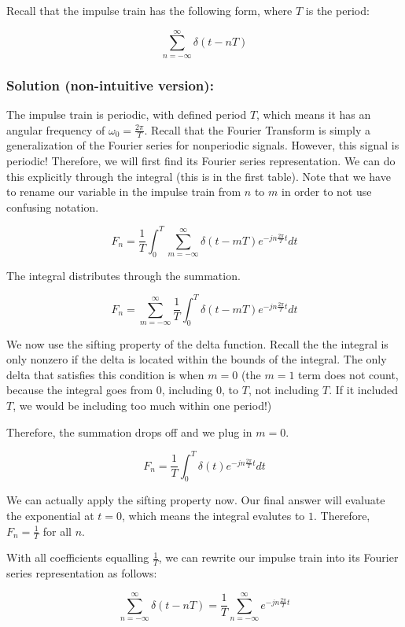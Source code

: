 \documentclass{article}
\begin{document}
Recall that the impulse train has the following form, where $T$ is the period:

$$\sum_{n = -\infty}^{\infty} \delta(t - nT)$$

\subsubsection{Solution (non-intuitive version):}

The impulse train is periodic, with defined period $T$, which means it has an angular frequency of $\omega_0 = \frac{2\pi}{T}$. Recall that the Fourier Transform is simply a generalization of the Fourier series for nonperiodic signals. However, this signal is periodic! Therefore, we will first find its Fourier series representation. We can do this explicitly through the integral (this is in the first table). Note that we have to rename our variable in the impulse train from $n$ to $m$ in order to not use confusing notation.

\[
F_n = \frac{1}{T}\int_{0}^{T} \sum_{m = -\infty}^{\infty} \delta(t - mT) e^{-jn\frac{2\pi}{T}t}dt
\]

The integral distributes through the summation.

\[
F_n = \sum_{m = -\infty}^{\infty} \frac{1}{T}\int_{0}^{T} \delta(t - mT) e^{-jn\frac{2\pi}{T}t}dt
\]

We now use the sifting property of the delta function. Recall the the integral is only nonzero if the delta is located within the bounds of the integral. The only delta that satisfies this condition is when $m = 0$ (the $m = 1$ term does not count, because the integral goes from $0$, including $0$, to $T$, not including $T$. If it included $T$, we would be including too much within one period!)

Therefore, the summation drops off and we plug in $m = 0$.

\[
F_n = \frac{1}{T}\int_{0}^{T} \delta(t) e^{-jn\frac{2\pi}{T}t}dt
\]

We can actually apply the sifting property now. Our final answer will evaluate the exponential at $t = 0$, which means the integral evalutes to $1$. Therefore, $F_n = \frac{1}{T}$ for all $n$.

With all coefficients equalling $\frac{1}{T}$, we can rewrite our impulse train into its Fourier series representation as follows:

\[
\sum_{n = -\infty}^{\infty} \delta(t-nT) = \frac{1}{T}\sum_{n = -\infty}^{\infty}e^{-jn\frac{2\pi}{T}t}
\]
\end{document}

